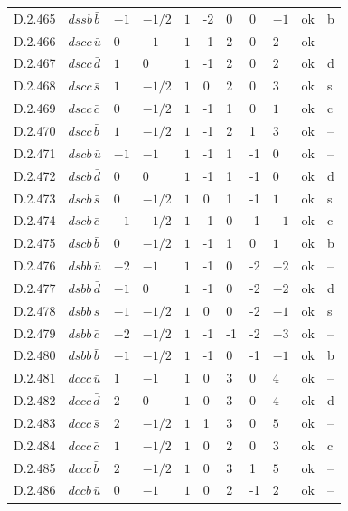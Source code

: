 {\begin{longtable}{@{}llllllllll>{\raggedright\arraybackslash}p{2.0cm}@{}}
D.2.465 & $dssb\,\bar{b}$ & $-1$ & $-1/2$ & $1$ & -2 & 0 & 0 & $-1$ & ok & b \\
D.2.466 & $dscc\,\bar{u}$ & $0$ & $-1$ & $1$ & -1 & 2 & 0 & $2$ & ok & -- \\
D.2.467 & $dscc\,\bar{d}$ & $1$ & $0$ & $1$ & -1 & 2 & 0 & $2$ & ok & d \\
D.2.468 & $dscc\,\bar{s}$ & $1$ & $-1/2$ & $1$ & 0 & 2 & 0 & $3$ & ok & s \\
D.2.469 & $dscc\,\bar{c}$ & $0$ & $-1/2$ & $1$ & -1 & 1 & 0 & $1$ & ok & c \\
D.2.470 & $dscc\,\bar{b}$ & $1$ & $-1/2$ & $1$ & -1 & 2 & 1 & $3$ & ok & -- \\
D.2.471 & $dscb\,\bar{u}$ & $-1$ & $-1$ & $1$ & -1 & 1 & -1 & $0$ & ok & -- \\
D.2.472 & $dscb\,\bar{d}$ & $0$ & $0$ & $1$ & -1 & 1 & -1 & $0$ & ok & d \\
D.2.473 & $dscb\,\bar{s}$ & $0$ & $-1/2$ & $1$ & 0 & 1 & -1 & $1$ & ok & s \\
D.2.474 & $dscb\,\bar{c}$ & $-1$ & $-1/2$ & $1$ & -1 & 0 & -1 & $-1$ & ok & c \\
D.2.475 & $dscb\,\bar{b}$ & $0$ & $-1/2$ & $1$ & -1 & 1 & 0 & $1$ & ok & b \\
D.2.476 & $dsbb\,\bar{u}$ & $-2$ & $-1$ & $1$ & -1 & 0 & -2 & $-2$ & ok & -- \\
D.2.477 & $dsbb\,\bar{d}$ & $-1$ & $0$ & $1$ & -1 & 0 & -2 & $-2$ & ok & d \\
D.2.478 & $dsbb\,\bar{s}$ & $-1$ & $-1/2$ & $1$ & 0 & 0 & -2 & $-1$ & ok & s \\
D.2.479 & $dsbb\,\bar{c}$ & $-2$ & $-1/2$ & $1$ & -1 & -1 & -2 & $-3$ & ok & -- \\
D.2.480 & $dsbb\,\bar{b}$ & $-1$ & $-1/2$ & $1$ & -1 & 0 & -1 & $-1$ & ok & b \\
D.2.481 & $dccc\,\bar{u}$ & $1$ & $-1$ & $1$ & 0 & 3 & 0 & $4$ & ok & -- \\
D.2.482 & $dccc\,\bar{d}$ & $2$ & $0$ & $1$ & 0 & 3 & 0 & $4$ & ok & d \\
D.2.483 & $dccc\,\bar{s}$ & $2$ & $-1/2$ & $1$ & 1 & 3 & 0 & $5$ & ok & -- \\
D.2.484 & $dccc\,\bar{c}$ & $1$ & $-1/2$ & $1$ & 0 & 2 & 0 & $3$ & ok & c \\
D.2.485 & $dccc\,\bar{b}$ & $2$ & $-1/2$ & $1$ & 0 & 3 & 1 & $5$ & ok & -- \\
D.2.486 & $dccb\,\bar{u}$ & $0$ & $-1$ & $1$ & 0 & 2 & -1 & $2$ & ok & -- \\

\end{longtable}}

